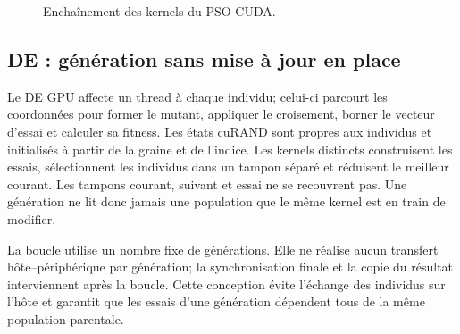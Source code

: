 \documentclass[conference]{IEEEtran}
\newcommand{\PSO}{\textsc{PSO}}
\newcommand{\DE}{\textsc{DE}}
\begin{document}
\begin{figure}[t]
\centering
{}
\caption{Enchaînement des kernels du \PSO{} CUDA.}
\label{fig:pso-kernels}
\end{figure}

\subsection{DE : génération sans mise à jour en place}
\label{sec:de-cuda}

Le \DE{} GPU affecte un thread à chaque individu; celui-ci parcourt les
coordonnées pour former le mutant, appliquer le croisement, borner le vecteur
d'essai et calculer sa fitness. Les états cuRAND sont propres aux individus
et initialisés à partir de la graine et de l'indice. Les kernels distincts
construisent les essais, sélectionnent les individus dans un tampon séparé et
réduisent le meilleur courant. Les tampons courant, suivant et essai ne se
recouvrent pas. Une génération ne lit donc jamais une population que le même
kernel est en train de modifier.

La boucle utilise un nombre fixe de générations. Elle ne réalise aucun
transfert hôte--périphérique par génération; la synchronisation finale et la
copie du résultat interviennent après la boucle. Cette conception évite
l'échange des individus sur l'hôte et garantit que les essais d'une génération
dépendent tous de la même population parentale.
\end{document}
